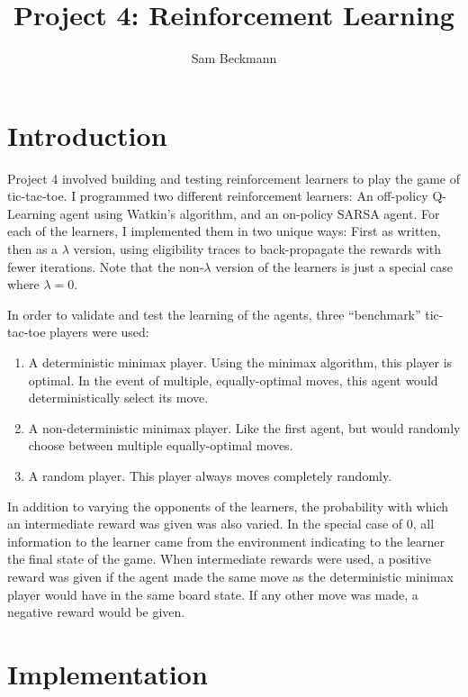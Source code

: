 \documentclass{article}
\begin{document}
\title{Project 4: Reinforcement Learning}
\author{Sam Beckmann}
\maketitle

\section{Introduction}

Project 4 involved building and testing reinforcement learners to play the game of tic-tac-toe. I programmed two different reinforcement learners: An off-policy Q-Learning agent using Watkin's algorithm, and an on-policy SARSA agent. For each of the learners, I implemented them in two unique ways: First as written, then as a $\lambda$ version, using eligibility traces to back-propagate the rewards with fewer iterations. Note that the non-$\lambda$ version of the learners is just a special case where $\lambda = 0$.

In order to validate and test the learning of the agents, three ``benchmark'' tic-tac-toe players were used:

\begin{enumerate}
\item A deterministic minimax player. Using the minimax algorithm, this player is optimal. In the event of multiple, equally-optimal moves, this agent would deterministically select its move.
\item A non-deterministic minimax player. Like the first agent, but would randomly choose between multiple equally-optimal moves.
\item A random player. This player always moves completely randomly.
\end{enumerate}

In addition to varying the opponents of the learners, the probability with which an intermediate reward was given was also varied. In the special case of 0, all information to the learner came from the environment indicating to the learner the final state of the game. When intermediate rewards were used, a positive reward was given if the agent made the same move as the deterministic minimax player would have in the same board state. If any other move was made, a negative reward would be given.

\section{Implementation}
\end{document}
